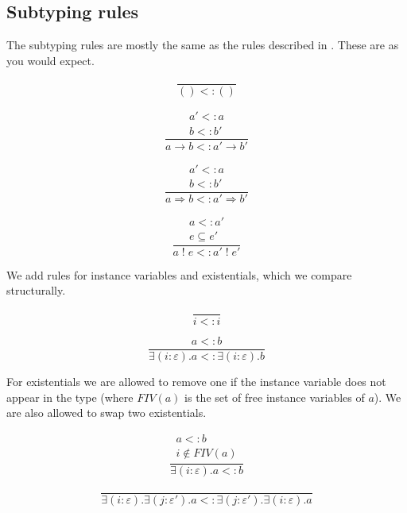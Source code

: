 \documentclass[12pt]{article}
\newcommand\eff[0]{\varepsilon}
\newcommand\tunit[0]{()}
\newcommand\tarr[2]{#1 \rightarrow #2}
\newcommand\thandler[2]{#1 \Rightarrow #2}
\newcommand\aty[2]{#1 \; ! \; #2}
\newcommand\texists[3]{\exists(#1:#2) . #3}
\newcommand\subty[2]{#1 <: #2}
\begin{document}
\newpage
\subsection{Subtyping rules}

The subtyping rules are mostly the same as the rules described in \cite{effectsystem}.
These are as you would expect.

\begin{minipage}{0.5\textwidth}
\[\frac{
}{
	\subty{\tunit}{\tunit}
}\]
\vspace{10pt}
\end{minipage}
\begin{minipage}{0.5\textwidth}
\[\frac{
	\begin{array}{l}
	\subty{a'}{a} \\
	\subty{b}{b'}
	\end{array}
}{
	\subty{\tarr{a}{b}}{\tarr{a'}{b'}}
}\]
\vspace{10pt}
\end{minipage}
\begin{minipage}{0.5\textwidth}
\[\frac{
	\begin{array}{l}
	\subty{a'}{a} \\
	\subty{b}{b'}
	\end{array}
}{
	\subty{\thandler{a}{b}}{\thandler{a'}{b'}}
}\]\vspace{10pt}
\end{minipage}
\begin{minipage}{0.5\textwidth}
\[\frac{
	\begin{array}{l}
	\subty{a}{a'} \\
	e \subseteq e'
	\end{array}
}{
	\subty{\aty{a}{e}}{\aty{a'}{e'}}
}\]\vspace{10pt}
\end{minipage}

We add rules for instance variables and existentials, which we compare structurally. \\
\begin{minipage}{0.5\textwidth}
\[\frac{
}{
	\subty{i}{i}
}\]
\end{minipage}
\begin{minipage}{0.5\textwidth}
\[\frac{
	\subty{a}{b}
}{
	\subty{\texists{i}{\eff}{a}}{\texists{i}{\eff}{b}}
}\]
\end{minipage}

For existentials we are allowed to remove one if the instance variable does not appear in the type (where $FIV(a)$ is the set of free instance variables of $a$). We are also allowed to swap two existentials.\\
\begin{minipage}{0.5\textwidth}
\[\frac{
	\begin{array}{l}
	\subty{a}{b} \\
	i \notin FIV(a)
	\end{array}
}{
	\subty{\texists{i}{\eff}{a}}{b}
}\]
\end{minipage}
\begin{minipage}{0.5\textwidth}
\[\frac{
}{
	\subty{\texists{i}{\eff}{\texists{j}{\eff'}{a}}}{\texists{j}{\eff'}{\texists{i}{\eff}{a}}}
}\]
\end{minipage}
\end{document}
